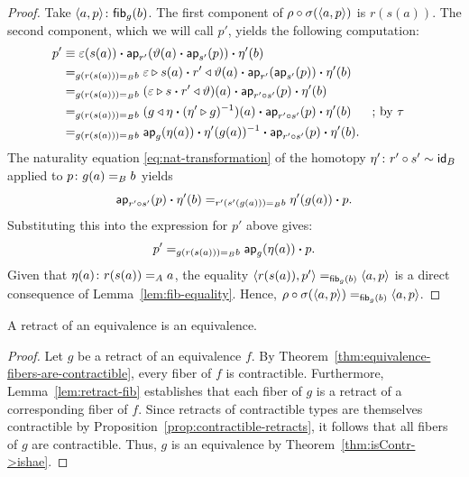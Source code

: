 \begin{proof}
    Take $\dep{a,p}\colon\fun{fib}_g(b)$. The first component of $\rho\circ\sigma(\langle a,p\rangle)$ is $r(s(a))$. The second component, which we will call $p'$, yields the following computation:
    \begin{align*}
        p' &\equiv
                \varepsilon(s(a))
                    \mathbin{\boldsymbol{\cdot}}\mathsf{ap}_{r'}(
                        \vartheta(a)
                        \mathbin{\boldsymbol{\cdot}}\mathsf{ap}_{s'}(p)
                    )
                    \mathbin{\boldsymbol{\cdot}}\eta'(b)\\
            &\mathrel{=_{g(r(s(a)))\mathrel{=_{B}} b}}
                \varepsilon\triangleright s(a)
                    \mathbin{\boldsymbol{\cdot}} r'\triangleleft\vartheta(a)
                    \mathbin{\boldsymbol{\cdot}}\mathsf{ap}_{r'}(
                        \mathsf{ap}_{s'}(p)
                    )\mathbin{\boldsymbol{\cdot}}\eta'(b)\\
            &\mathrel{=_{g(r(s(a)))\mathrel{=_{B}} b}}
                (
                    \varepsilon\triangleright s
                    \mathbin{\boldsymbol{\cdot}} r'\triangleleft\vartheta
                )(a)
                    \mathbin{\boldsymbol{\cdot}}\mathsf{ap}_{r'\circ s'}(p)
                    \mathbin{\boldsymbol{\cdot}}\eta'(b)\\
            &\mathrel{=_{g(r(s(a)))\mathrel{=_{B}} b}}
                (
                    g\triangleleft\eta
                    \mathbin{\boldsymbol{\cdot}}(\eta'\triangleright g)^{-1}
                )(a)
                    \mathbin{\boldsymbol{\cdot}}\mathsf{ap}_{r'\circ s'}(p)
                    \mathbin{\boldsymbol{\cdot}}\eta'(b)
                    &&\text{; by }\tau\\
            &\mathrel{=_{g(r(s(a)))\mathrel{=_{B}} b}} 
                \mathsf{ap}_g(\eta(a))
                    \mathbin{\boldsymbol{\cdot}}\eta'(g(a))^{-1}
                    \mathbin{\boldsymbol{\cdot}}\mathsf{ap}_{r'\circ s'}(p)
                    \mathbin{\boldsymbol{\cdot}}\eta'(b).
    \end{align*}
    The naturality equation \eqref{eq:nat-transformation} of the homotopy $\eta'\colon r'\circ s'\sim\id_B$ applied to $p\colon g(a)\eq{B} b$ yields
    \[
        \mathsf{ap}_{r'\circ s'}(p)\mathbin{\boldsymbol{\cdot}}\eta'(b)
        \mathrel{=_{r'(s'(g(a)))\mathrel{=_{B}} b}}\eta'(g(a))\mathbin{\boldsymbol{\cdot}} p.
    \]
    Substituting this into the expression for $p'$ above gives:
    \[
        p' \mathrel{=_{g(r(s(a)))\mathrel{=_{B}} b}} \mathsf{ap}_g(\eta(a))\mathbin{\boldsymbol{\cdot}} p.
    \]
    Given that $\eta(a)\colon r(s(a))\eq{A} a$, the equality $\langle r(s(a)),p'\rangle\mathrel{=_{\mathsf{fib}_g(b)}}\langle a,p\rangle$ is a direct consequence of Lemma~\ref{lem:fib-equality}. Hence, $\rho\circ\sigma(\langle a,p\rangle)\mathrel{=_{\mathsf{fib}_g(b)}}\langle a,p\rangle$.
    
\end{proof}

\begin{thm}
    A retract of an equivalence is an equivalence.
\end{thm}

\begin{proof}
    Let $g$ be a retract of an equivalence $f$. By Theorem~\ref{thm:equivalence-fibers-are-contractible}, every fiber of $f$ is contractible. Furthermore, Lemma~\ref{lem:retract-fib} establishes that each fiber of $g$ is a retract of a corresponding fiber of $f$. Since retracts of contractible types are themselves contractible by Proposition~\ref{prop:contractible-retracts}, it follows that all fibers of $g$ are contractible. Thus, $g$ is an equivalence by Theorem~\ref{thm:isContr->ishae}.

\end{proof}

